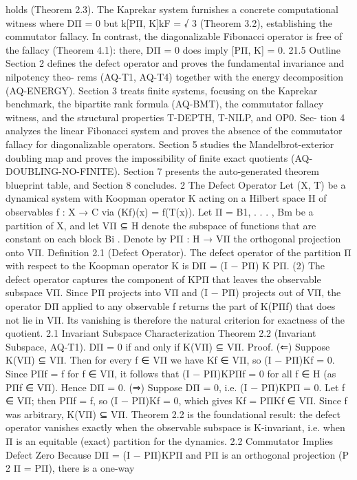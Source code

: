 holds (Theorem 2.3). The Kaprekar system furnishes a concrete computational witness where
DΠ = 0 but k[PΠ, K]kF =
√
3 (Theorem 3.2), establishing the commutator fallacy. In contrast, the
diagonalizable Fibonacci operator is free of the fallacy (Theorem 4.1): there, DΠ = 0 does imply
[PΠ, K] = 0.
21.5 Outline
Section 2 defines the defect operator and proves the fundamental invariance and nilpotency theo-
rems (AQ-T1, AQ-T4) together with the energy decomposition (AQ-ENERGY). Section 3 treats
finite systems, focusing on the Kaprekar benchmark, the bipartite rank formula (AQ-BMT), the
commutator fallacy witness, and the structural properties T-DEPTH, T-NILP, and OP0. Sec-
tion 4 analyzes the linear Fibonacci system and proves the absence of the commutator fallacy
for diagonalizable operators. Section 5 studies the Mandelbrot-exterior doubling map and proves
the impossibility of finite exact quotients (AQ-DOUBLING-NO-FINITE). Section 7 presents the
auto-generated theorem blueprint table, and Section 8 concludes.
2 The Defect Operator
Let (X, T) be a dynamical system with Koopman operator K acting on a Hilbert space H of
observables f : X → C via (Kf)(x) = f(T(x)). Let Π = {B1, . . . , Bm} be a partition of X,
and let VΠ ⊆ H denote the subspace of functions that are constant on each block Bi
. Denote by
PΠ : H → VΠ the orthogonal projection onto VΠ.
Definition 2.1 (Defect Operator). The defect operator of the partition Π with respect to the
Koopman operator K is
DΠ = (I − PΠ) K PΠ. (2)
The defect operator captures the component of KPΠ that leaves the observable subspace VΠ.
Since PΠ projects into VΠ and (I − PΠ) projects out of VΠ, the operator DΠ applied to any
observable f returns the part of K(PΠf) that does not lie in VΠ. Its vanishing is therefore the
natural criterion for exactness of the quotient.
2.1 Invariant Subspace Characterization
Theorem 2.2 (Invariant Subspace, AQ-T1). DΠ = 0 if and only if K(VΠ) ⊆ VΠ.
Proof. (⇐) Suppose K(VΠ) ⊆ VΠ. Then for every f ∈ VΠ we have Kf ∈ VΠ, so (I − PΠ)Kf = 0.
Since PΠf = f for f ∈ VΠ, it follows that (I − PΠ)KPΠf = 0 for all f ∈ H (as PΠf ∈ VΠ). Hence
DΠ = 0.
(⇒) Suppose DΠ = 0, i.e. (I − PΠ)KPΠ = 0. Let f ∈ VΠ; then PΠf = f, so (I − PΠ)Kf = 0,
which gives Kf = PΠKf ∈ VΠ. Since f was arbitrary, K(VΠ) ⊆ VΠ.
Theorem 2.2 is the foundational result: the defect operator vanishes exactly when the observable
subspace is K-invariant, i.e. when Π is an equitable (exact) partition for the dynamics.
2.2 Commutator Implies Defect Zero
Because DΠ = (I − PΠ)KPΠ and PΠ is an orthogonal projection (P
2
Π = PΠ), there is a one-way
